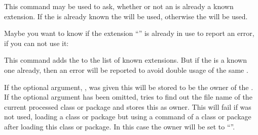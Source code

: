 \begin{Declaration}
\end{Declaration}
%
This command
may be used to ask, whether or not an  is already a known
extension.  If the  is already known the  will be used, otherwise the  will be
used.
\begin{Example}
  Maybe you want to know if the extension ``'' is already in use to
  report an error, if you can not use it:
\begin{lstcode}
\end{lstcode}
\end{Example}
%

\begin{Declaration}
\end{Declaration}
%
This command
adds the  to the list of known extensions. But if the
 is a known one already, then an error will be reported to
avoid double usage of the same .

If the optional argument, , was given this 
will be stored to be the owner of the .  If the optional
argument has been omitted,  tries to find out the file name
of the current processed class or package and stores this as owner.
This will fail if  was not used,
loading a class or package but using a command of a class or package after
loading this class or package.  In this case the owner will be set to
``''.

